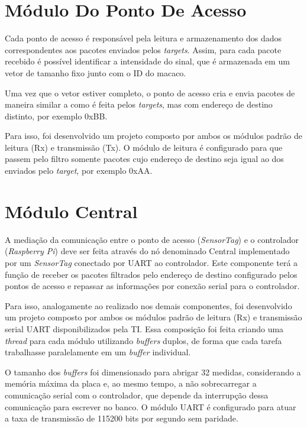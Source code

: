 \section{Módulo Do Ponto De Acesso}

Cada ponto de acesso é responsável pela leitura e armazenamento dos dados correspondentes aos pacotes enviados pelos \emph{targets}. Assim, para cada pacote recebido é possível identificar a intensidade do sinal, que é armazenada em um vetor de tamanho fixo junto com o ID do macaco.

Uma vez que o vetor estiver completo, o ponto de acesso cria e envia pacotes de maneira similar a como é feita pelos \emph{targets}, mas com endereço de destino distinto, por exemplo 0xBB.

Para isso, foi desenvolvido um projeto composto por ambos os módulos padrão de leitura (Rx) e transmissão (Tx). O módulo de leitura é configurado para que passem pelo filtro somente pacotes cujo endereço de destino seja igual ao dos enviados pelo \emph{target}, por exemplo 0xAA.

\section{Módulo Central}

A mediação da comunicação entre o ponto de acesso (\emph{SensorTag}) e o controlador (\emph{Raspberry Pi}) deve ser feita através do nó denominado Central implementado por um \emph{SensorTag} conectado por UART ao controlador.
Este componente terá a função de receber os pacotes filtrados pelo endereço de destino configurado pelos pontos de acesso e repassar as informações por conexão serial para o controlador.

Para isso, analogamente ao realizado nos demais componentes, foi desenvolvido um projeto composto por ambos os módulos padrão de leitura (Rx) e transmissão serial UART disponibilizados pela TI. Essa composição foi feita criando uma \emph{thread} para cada módulo utilizando \emph{buffers} duplos, de forma que cada tarefa trabalhasse paralelamente em um \emph{buffer} individual.

O tamanho dos \emph{buffers} foi dimensionado para abrigar 32 medidas, considerando a memória máxima da placa e, ao mesmo tempo, a não sobrecarregar a comunicação serial com o controlador, que depende da interrupção dessa comunicação para escrever no banco. O módulo UART é configurado para atuar a taxa de transmissão de 115200 bits por segundo sem paridade.

